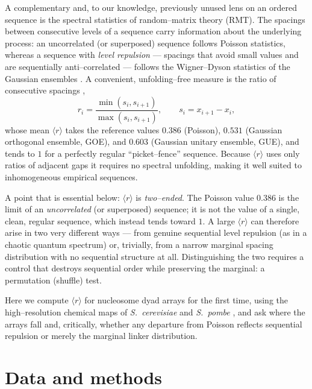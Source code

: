 \documentclass[11pt]{article}
\renewcommand{\r}{\langle r\rangle}
\begin{document}
A complementary and, to our knowledge, previously unused lens on an ordered
sequence is the spectral statistics of random--matrix theory (RMT). The spacings
between consecutive levels of a sequence carry information about the underlying
process: an uncorrelated (or superposed) sequence follows Poisson statistics,
whereas a sequence with \emph{level repulsion} --- spacings that avoid small
values and are sequentially anti--correlated --- follows the Wigner--Dyson
statistics of the Gaussian ensembles \citep{bohigas1984,berry1977,mehta2004}. A
convenient, unfolding--free measure is the ratio of consecutive spacings
\citep{oganesyan2007,atas2013},
\begin{equation}
r_i=\frac{\min(s_i,s_{i+1})}{\max(s_i,s_{i+1})},\qquad s_i=x_{i+1}-x_i,
\label{eq:r}
\end{equation}
whose mean $\r$ takes the reference values $0.386$ (Poisson), $0.531$ (Gaussian
orthogonal ensemble, GOE), and $0.603$ (Gaussian unitary ensemble, GUE), and
tends to $1$ for a perfectly regular ``picket--fence'' sequence. Because
$\r$ uses only ratios of adjacent gaps it requires no spectral unfolding,
making it well suited to inhomogeneous empirical sequences.

A point that is essential below: $\r$ is \emph{two--ended}. The Poisson value
$0.386$ is the limit of an \emph{uncorrelated} (or superposed) sequence; it is
not the value of a single, clean, regular sequence, which instead tends toward
$1$. A large $\r$ can therefore arise in two very different ways --- from genuine
sequential level repulsion (as in a chaotic quantum spectrum) or, trivially,
from a narrow marginal spacing distribution with no sequential structure at all.
Distinguishing the two requires a control that destroys sequential order while
preserving the marginal: a permutation (shuffle) test.

Here we compute $\r$ for nucleosome dyad arrays for the first time, using the
high--resolution chemical maps of \textit{S.\ cerevisiae} \citep{brogaard2012}
and \textit{S.\ pombe} \citep{moyle2013}, and ask where the arrays fall and,
critically, whether any departure from Poisson reflects sequential repulsion or
merely the marginal linker distribution.

\section{Data and methods}
\end{document}

